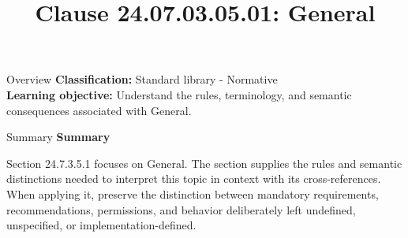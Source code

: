 \documentclass[10pt,letterpaper]{article}
\title{Clause 24.07.03.05.01: General}
\author{}
\date{}
\begin{document}
\maketitle
\begin{CornellOverviewBox}{Overview}
\textbf{Classification:} Standard library - Normative\\[2pt]
\textbf{Learning objective:} Understand the rules, terminology, and semantic consequences associated with General.
\end{CornellOverviewBox}\begin{CornellSummaryBox}{Summary}
{\sffamily\bfseries\color{Accent} Summary}\par\vspace{3pt}Section 24.7.3.5.1 focuses on General. The section supplies the rules and semantic distinctions needed to interpret this topic in context with its cross-references. When applying it, preserve the distinction between mandatory requirements, recommendations, permissions, and behavior deliberately left undefined, unspecified, or implementation-defined.
\end{CornellSummaryBox}
\end{document}
